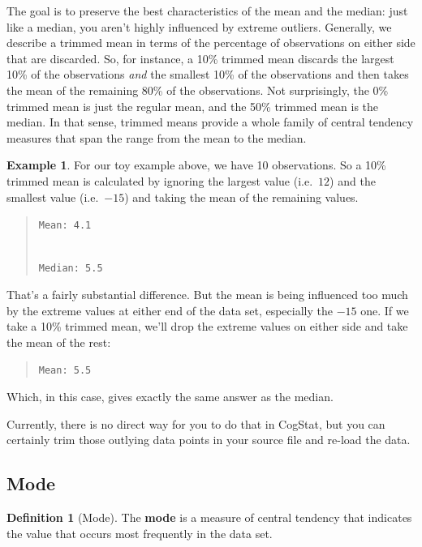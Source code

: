 \documentclass[
]{book}
\theoremstyle{definition}
\newtheorem{definition}{Definition}[chapter]
\theoremstyle{definition}
\newtheorem{example}{Example}[chapter]
\theoremstyle{definition}
\theoremstyle{definition}
\theoremstyle{remark}
\begin{document}
The goal is to preserve the best characteristics of the mean and the median: just like a median, you aren't highly influenced by extreme outliers. Generally, we describe a trimmed mean in terms of the percentage of observations on either side that are discarded. So, for instance, a 10\% trimmed mean discards the largest 10\% of the observations \emph{and} the smallest 10\% of the observations and then takes the mean of the remaining 80\% of the observations. Not surprisingly, the 0\% trimmed mean is just the regular mean, and the 50\% trimmed mean is the median. In that sense, trimmed means provide a whole family of central tendency measures that span the range from the mean to the median.

\begin{example}
\protect\hypertarget{exm:extrimmedmean}{}\label{exm:extrimmedmean}For our toy example above, we have 10 observations. So a 10\% trimmed mean is calculated by ignoring the largest value (i.e.~\(12\)) and the smallest value (i.e.~\(-15\)) and taking the mean of the remaining values.

\begin{quote}
\texttt{Mean:\ 4.1}\strut \\
\texttt{Median:\ 5.5}
\end{quote}

That's a fairly substantial difference. But the mean is being influenced too much by the extreme values at either end of the data set, especially the \(-15\) one. If we take a 10\% trimmed mean, we'll drop the extreme values on either side and take the mean of the rest:

\begin{quote}
\texttt{Mean:\ 5.5}
\end{quote}

Which, in this case, gives exactly the same answer as the median.
\end{example}

Currently, there is no direct way for you to do that in CogStat, but you can certainly trim those outlying data points in your source file and re-load the data.

\hypertarget{mode}{%
\subsection{Mode}\label{mode}}

\begin{definition}[Mode]
\protect\hypertarget{def:defmode}{}\label{def:defmode}The \textbf{mode} is a measure of central tendency that indicates the value that occurs most frequently in the data set.
\end{definition}
\end{document}
